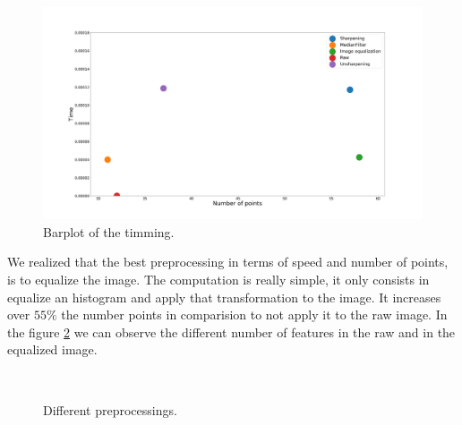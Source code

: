 \begin{figure}[H]
\centering         
\includegraphics[width=0.9\linewidth]{tracker/preprocesing.png}
\caption{Barplot of the timming.} \label{timing1}
\end{figure}

We realized that the best preprocessing in terms of speed and number of points, is to equalize the image. The computation is really simple, it only consists in equalize an histogram and apply that transformation to the image. It increases over $ 55 \%$ the number points in comparision to not apply it to the raw image. In the figure \ref{prepoes} we can observe the different number of features in the raw and in the equalized image.

\begin{figure}[H]
		
\centering

\\
\caption{Different preprocessings.}
\label{prepoes}
\end{figure}


